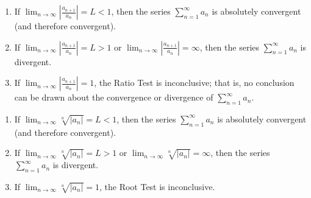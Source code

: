 \begin{theorem}
    \begin{enumerate}
        \item If
        \(\displaystyle{\lim_{n\to\infty}\left|\frac{a_{n+1}}{a_n}\right|}
        =L<1\),
        then the series \(\displaystyle{\sum_{n=1}^\infty}a_n\) is absolutely
        convergent (and therefore convergent).
        \item If
        \(\displaystyle{\lim_{n\to\infty}\left|\frac{a_{n+1}}{a_n}\right|}
        =L>1\)
        or
        \(\displaystyle{\lim_{n\to\infty}\left|\frac{a_{n+1}}{a_n}\right|}
        =\infty\),
        then the series \(\displaystyle{\sum_{n=1}^\infty}a_n\) is divergent.
        \item If
        \(\displaystyle{\lim_{n\to\infty}\left|\frac{a_{n+1}}{a_n}\right|}
        =1\),
        the Ratio Test is inconclusive; that is, no conclusion can be drawn
        about the convergence or divergence of
        \(\displaystyle{\sum_{n=1}^\infty}a_n\).
    \end{enumerate}
\end{theorem}

\begin{theorem}
    \begin{enumerate}
        \item If
        \(\displaystyle{\lim_{n\to\infty}\sqrt[n]{|a_n|}}=L<1\),
        then the series \(\displaystyle{\sum_{n=1}^\infty}a_n\) is absolutely
        convergent (and therefore convergent).
        \item If
        \(\displaystyle{\lim_{n\to\infty}\sqrt[n]{|a_n|}}=L>1\)
        or
        \(\displaystyle{\lim_{n\to\infty}\sqrt[n]{|a_n|}}
        =\infty\),
        then the series \(\displaystyle{\sum_{n=1}^\infty}a_n\) is divergent.
        \item If
        \(\displaystyle{\lim_{n\to\infty}\sqrt[n]{|a_n|}}=1\),
        the Root Test is inconclusive.
    \end{enumerate}
\end{theorem}